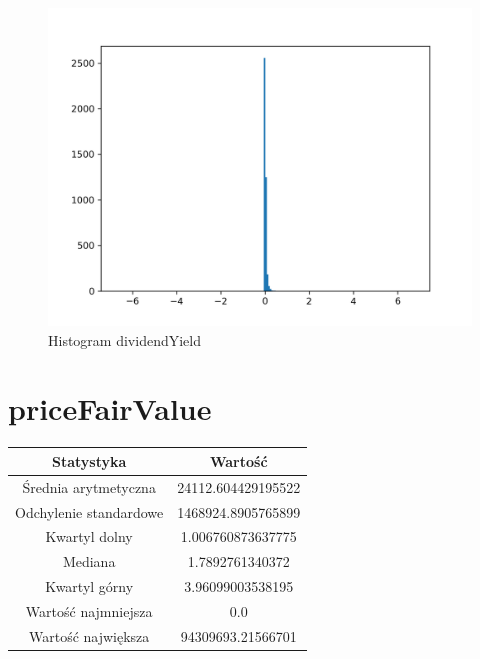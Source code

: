 \documentclass{article}
\begin{document}
\begin{figure}[h!]
    \includegraphics[width=\linewidth]{variables/dividendYield.png}
    \caption{Histogram dividendYield }
\end{figure}\section{ priceFairValue }

\begin{center}
    \begin{tabular}{|c | c|} 
    \hline
    Statystyka & Wartość \\
    \hline\hline
    Średnia arytmetyczna & 24112.604429195522 \\ 
    \hline
    Odchylenie standardowe & 1468924.8905765899 \\
    \hline
    Kwartyl dolny & 1.006760873637775 \\
    \hline
    Mediana & 1.7892761340372 \\
    \hline
    Kwartyl górny & 3.96099003538195 \\
    \hline
    Wartość najmniejsza & 0.0 \\
    \hline
    Wartość największa & 94309693.21566701 \\
    \hline
   \end{tabular}
\end{center}
\end{document}
